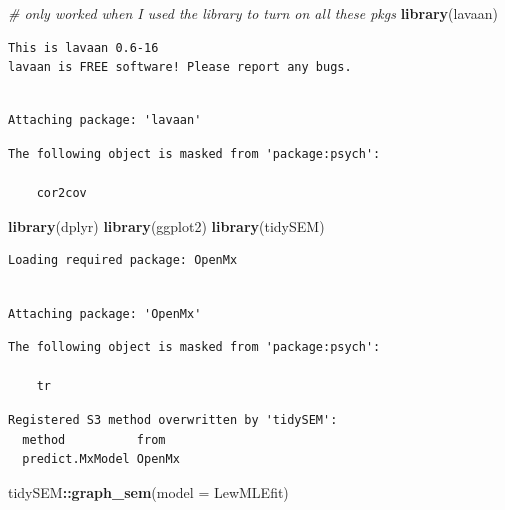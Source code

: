 \documentclass[
  11pt,
]{book}
\newenvironment{Shaded}{\begin{snugshade}}{\end{snugshade}}
\newcommand{\AttributeTok}[1]{\textcolor[rgb]{0.27,0.27,0.27}{#1}}
\newcommand{\CommentTok}[1]{\textcolor[rgb]{0.37,0.37,0.37}{\textit{#1}}}
\newcommand{\FunctionTok}[1]{\textcolor[rgb]{0.27,0.27,0.27}{\textbf{#1}}}
\newcommand{\NormalTok}[1]{#1}
\newcommand{\SpecialCharTok}[1]{\textcolor[rgb]{0.43,0.43,0.43}{\textbf{#1}}}
\begin{document}
\begin{Shaded}
\begin{Highlighting}[]
\CommentTok{\# only worked when I used the library to turn on all these pkgs}
\FunctionTok{library}\NormalTok{(lavaan)}
\end{Highlighting}
\end{Shaded}

\begin{verbatim}
This is lavaan 0.6-16
lavaan is FREE software! Please report any bugs.
\end{verbatim}

\begin{verbatim}

Attaching package: 'lavaan'
\end{verbatim}

\begin{verbatim}
The following object is masked from 'package:psych':

    cor2cov
\end{verbatim}

\begin{Shaded}
\begin{Highlighting}[]
\FunctionTok{library}\NormalTok{(dplyr)}
\FunctionTok{library}\NormalTok{(ggplot2)}
\FunctionTok{library}\NormalTok{(tidySEM)}
\end{Highlighting}
\end{Shaded}

\begin{verbatim}
Loading required package: OpenMx
\end{verbatim}

\begin{verbatim}

Attaching package: 'OpenMx'
\end{verbatim}

\begin{verbatim}
The following object is masked from 'package:psych':

    tr
\end{verbatim}

\begin{verbatim}
Registered S3 method overwritten by 'tidySEM':
  method          from  
  predict.MxModel OpenMx
\end{verbatim}

\begin{Shaded}
\begin{Highlighting}[]
\NormalTok{tidySEM}\SpecialCharTok{::}\FunctionTok{graph\_sem}\NormalTok{(}\AttributeTok{model =}\NormalTok{ LewMLEfit)}
\end{Highlighting}
\end{Shaded}
\end{document}
